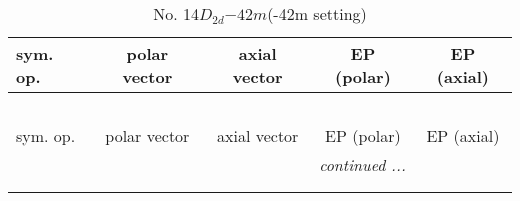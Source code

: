 \documentclass[fleqn,10pt,landscape]{jsarticle}
\begin{document}
\begin{center}
\renewcommand{\arraystretch}{1.3}
\begin{longtable}{lcccc}
\caption{No. 14\quad$D_{2d}$\quad$-42m$\quad(-42m setting)\quad[ tetragonal ]}
 \\
 \hline \hline
sym. op. & polar vector & axial vector & EP (polar) & EP (axial) \\ \hline \endfirsthead

\multicolumn{4}{l}{\tablename\ \thetable{}} \\
 \hline \hline
sym. op. & polar vector & axial vector & EP (polar) & EP (axial) \\ \hline \endhead

 \hline \hline
\multicolumn{4}{r}{\footnotesize\it continued ...} \\ \endfoot

 \hline \hline
\multicolumn{4}{r}{} \\ \endlastfoot


\end{longtable}
\end{center}
\end{document}

